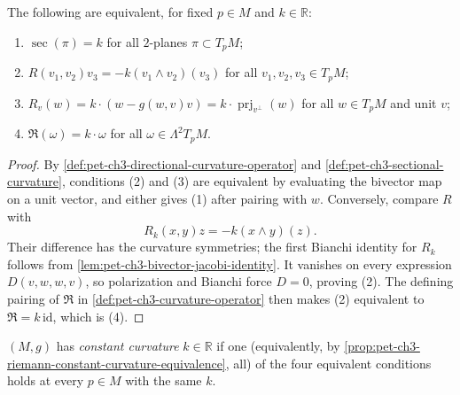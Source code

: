 \begin{proposition}
  \label{prop:pet-ch3-riemann-constant-curvature-equivalence}


  The following are equivalent, for fixed $p\in M$ and $k\in\mathbb R$:
  \begin{enumerate}
    \item[(1)] $\sec(\pi)=k$ for all $2$-planes $\pi\subset T_pM$;
    \item[(2)] $R(v_1,v_2)v_3=-k(v_1\wedge v_2)(v_3)$ for all $v_1,v_2,v_3\in T_pM$;
    \item[(3)] $R_v(w)=k\cdot(w-g(w,v)v)=k\cdot\operatorname{prj}_{v^\perp}(w)$ for all
    $w\in T_pM$ and unit $v$;
    \item[(4)] $\mathfrak R(\omega)=k\cdot\omega$ for all $\omega\in\Lambda^2T_pM$.
  \end{enumerate}
\end{proposition}
\begin{proof}

  \sketch
  By \cref{def:pet-ch3-directional-curvature-operator} and
  \cref{def:pet-ch3-sectional-curvature},
  conditions (2) and (3) are equivalent by evaluating the bivector map on a
  unit vector, and either gives (1) after pairing with $w$. Conversely, compare
  $R$ with
  \[
   R_k(x,y)z=-k(x\wedge y)(z).
  \]
  Their difference has the curvature symmetries; the first Bianchi identity for
  $R_k$ follows from \cref{lem:pet-ch3-bivector-jacobi-identity}. It vanishes on
  every expression $D(v,w,w,v)$, so polarization and Bianchi force $D=0$,
  proving (2). The defining pairing of $\mathfrak R$ in
  \cref{def:pet-ch3-curvature-operator} then makes (2) equivalent to
  $\mathfrak R=k\,\mathrm{id}$, which is (4).
\end{proof}

\begin{definition}
  \label{def:pet-ch3-constant-curvature}


  $(M,g)$ has \emph{constant curvature} $k\in\mathbb R$ if one (equivalently, by
  \cref{prop:pet-ch3-riemann-constant-curvature-equivalence}, all) of the four
  equivalent conditions holds at every $p\in M$ with the same $k$.
\end{definition}

